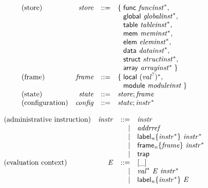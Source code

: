 $$
\begin{array}{@{}lrrl@{}l@{}}
\mbox{(store)} & {\mathit{store}} &::=& \{\; \begin{array}[t]{@{}l@{}l@{}}
\mathsf{func}~{{\mathit{funcinst}}^\ast},\; \\
  \mathsf{global}~{{\mathit{globalinst}}^\ast},\; \\
  \mathsf{table}~{{\mathit{tableinst}}^\ast},\; \\
  \mathsf{mem}~{{\mathit{meminst}}^\ast},\; \\
  \mathsf{elem}~{{\mathit{eleminst}}^\ast},\; \\
  \mathsf{data}~{{\mathit{datainst}}^\ast},\; \\
  \mathsf{struct}~{{\mathit{structinst}}^\ast},\; \\
  \mathsf{array}~{{\mathit{arrayinst}}^\ast} \;\}\end{array} \\
\mbox{(frame)} & {\mathit{frame}} &::=& \{\; \begin{array}[t]{@{}l@{}l@{}}
\mathsf{local}~{({{\mathit{val}}^?})^\ast},\; \\
  \mathsf{module}~{\mathit{moduleinst}} \;\}\end{array} \\
\mbox{(state)} & {\mathit{state}} &::=& {\mathit{store}} ; {\mathit{frame}} \\
\mbox{(configuration)} & {\mathit{config}} &::=& {\mathit{state}} ; {{\mathit{instr}}^\ast} \\
\end{array}
$$

\vspace{1ex}

$$
\begin{array}{@{}lrrl@{}l@{}}
\mbox{(administrative instruction)} & {\mathit{instr}} &::=& {\mathit{instr}} \\ &&|&
{\mathit{addrref}} \\ &&|&
{{\mathsf{label}}_{{\mathit{n}}}}{\{{{\mathit{instr}}^\ast}\}}~{{\mathit{instr}}^\ast} \\ &&|&
{{\mathsf{frame}}_{{\mathit{n}}}}{\{{\mathit{frame}}\}}~{{\mathit{instr}}^\ast} \\ &&|&
\mathsf{trap} \\
\mbox{(evaluation context)} & {\mathit{E}} &::=& [\mathsf{\_}] \\ &&|&
{{\mathit{val}}^\ast}~{\mathit{E}}~{{\mathit{instr}}^\ast} \\ &&|&
{{\mathsf{label}}_{{\mathit{n}}}}{\{{{\mathit{instr}}^\ast}\}}~{\mathit{E}} \\
\end{array}
$$

